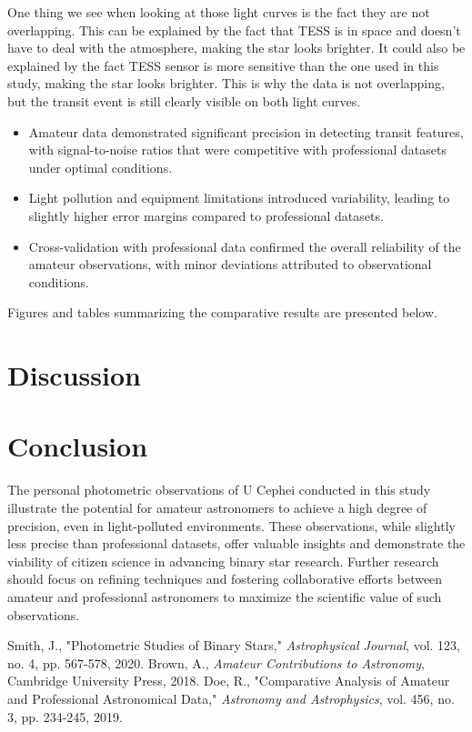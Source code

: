 \documentclass[12pt,a4paper]{article}
\begin{document}
One thing we see when looking at those light curves is the fact they are not overlapping. This can be explained by the fact that TESS is in space and doesn't have to deal with the atmosphere, making the star looks brighter. It could also be explained by the fact
TESS sensor is more sensitive than the one used in this study, making the star looks brighter. This is why the data is not overlapping, but the transit event is still clearly visible on both light curves.


\begin{itemize}
    \item Amateur data demonstrated significant precision in detecting transit features, with signal-to-noise ratios that were competitive with professional datasets under optimal conditions.
    \item Light pollution and equipment limitations introduced variability, leading to slightly higher error margins compared to professional datasets.
    \item Cross-validation with professional data confirmed the overall reliability of the amateur observations, with minor deviations attributed to observational conditions.
\end{itemize}
Figures and tables summarizing the comparative results are presented below.


\section{Discussion}

\section{Conclusion}
The personal photometric observations of U Cephei conducted in this study illustrate the potential for amateur astronomers to achieve a high degree of precision, even in light-polluted environments. These observations, while slightly less precise than professional datasets, offer valuable insights and demonstrate the viability of citizen science in advancing binary star research. Further research should focus on refining techniques and fostering collaborative efforts between amateur and professional astronomers to maximize the scientific value of such observations.

\begin{thebibliography}{99}
 Smith, J., "Photometric Studies of Binary Stars," \textit{Astrophysical Journal}, vol. 123, no. 4, pp. 567-578, 2020.
 Brown, A., \textit{Amateur Contributions to Astronomy}, Cambridge University Press, 2018.
 Doe, R., "Comparative Analysis of Amateur and Professional Astronomical Data," \textit{Astronomy and Astrophysics}, vol. 456, no. 3, pp. 234-245, 2019.
\end{thebibliography}
\end{document}
